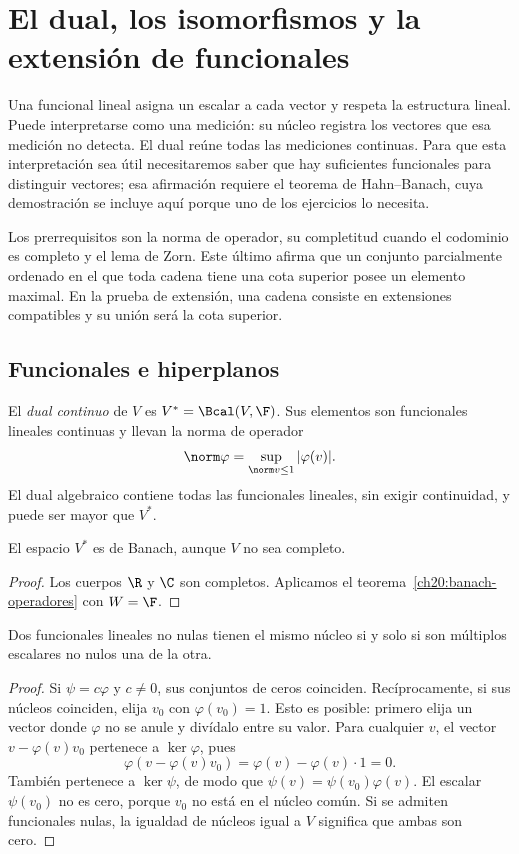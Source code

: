 \chapter{El dual, los isomorfismos y la extensión de funcionales}\label{chap:21}

Una funcional lineal asigna un escalar a cada vector y respeta la estructura lineal. Puede interpretarse como una medición: su núcleo registra los vectores que esa medición no detecta. El dual reúne todas las mediciones continuas. Para que esta interpretación sea útil necesitaremos saber que hay suficientes funcionales para distinguir vectores; esa afirmación requiere el teorema de Hahn--Banach, cuya demostración se incluye aquí porque uno de los ejercicios lo necesita.

Los prerrequisitos son la norma de operador, su completitud cuando el codominio es completo y el lema de Zorn. Este último afirma que un conjunto parcialmente ordenado en el que toda cadena tiene una cota superior posee un elemento maximal. En la prueba de extensión, una cadena consiste en extensiones compatibles y su unión será la cota superior.

\section{Funcionales e hiperplanos}

\begin{definicion}
El \emph{dual continuo} de $V$ es $V^*=\Bcal(V,\F)$. Sus elementos son funcionales lineales continuas y llevan la norma de operador
\[\norm\varphi=\sup_{\norm v\leq1}|\varphi(v)|.\]
El dual algebraico contiene todas las funcionales lineales, sin exigir continuidad, y puede ser mayor que $V^*$.
\end{definicion}

\begin{proposicion}
El espacio $V^*$ es de Banach, aunque $V$ no sea completo.
\end{proposicion}
\begin{proof}
Los cuerpos $\R$ y $\C$ son completos. Aplicamos el teorema~\ref{ch20:banach-operadores} con $W=\F$.
\end{proof}

\begin{proposicion}\label{ch21:kernel-proporcional}
Dos funcionales lineales no nulas tienen el mismo núcleo si y solo si son múltiplos escalares no nulos una de la otra.
\end{proposicion}
\begin{proof}
Si $\psi=c\varphi$ y $c\ne0$, sus conjuntos de ceros coinciden. Recíprocamente, si sus núcleos coinciden, elija $v_0$ con $\varphi(v_0)=1$. Esto es posible: primero elija un vector donde $\varphi$ no se anule y divídalo entre su valor. Para cualquier $v$, el vector $v-\varphi(v)v_0$ pertenece a $\ker\varphi$, pues
\[
 \varphi(v-\varphi(v)v_0)=\varphi(v)-\varphi(v)\cdot1=0.
\]
También pertenece a $\ker\psi$, de modo que $\psi(v)=\psi(v_0)\varphi(v)$. El escalar $\psi(v_0)$ no es cero, porque $v_0$ no está en el núcleo común. Si se admiten funcionales nulas, la igualdad de núcleos igual a $V$ significa que ambas son cero.
\end{proof}

